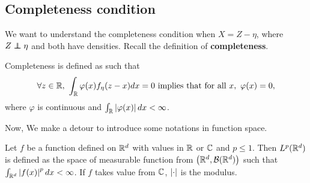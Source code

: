 \subsection{Completeness condition}

We want to understand the completeness condition when $X=Z-\eta$, where $Z
    \perp\!\!\!\!\perp \eta$ and both have densities. Recall the definition of
\textbf{completeness}.
\begin{definition}[Completeness]
    \label{completeness}
    Completeness is defined as such that $$
        \forall z \in \R,\ \int_\R \varphi(x)f_\eta(z-x)dx=0 \text{ implies that for all } x,\ \varphi(x)=0,$$
    where $\varphi$ is continuous and $\int_{\mathbb{R}}  \left| {\varphi(x)}\right|dx <\infty$.
\end{definition}
Now, We make a detour to introduce some notations in function space.
\begin{definition}
    Let $f$ be a function defined on $\mathbb{R}^d$ with values in $\mathbb{R}$ or $\mathbb{C}$ and $p\le 1$. Then $L^p(\mathbb{R}^d)$ is defined as the space of measurable function from $\left(\mathbb{R}^d,\mathcal{B}(\mathbb{R}^d)\right)$ such that $\int_{\mathbb{R}^d}\left| f(x)\right|^p dx<\infty$. If $f$ takes value from $\mathbb{C}$, $\left| \cdot\right|$ is the modulus.
\end{definition}

